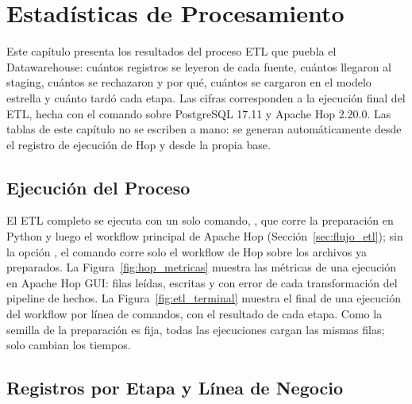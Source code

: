 \section{Estadísticas de Procesamiento}
\label{sec:estadisticas}

Este capítulo presenta los resultados del proceso ETL que puebla el
Datawarehouse: cuántos registros se leyeron de cada fuente, cuántos llegaron
al staging, cuántos se rechazaron y por qué, cuántos se cargaron en el modelo
estrella y cuánto tardó cada etapa. Las cifras corresponden a la ejecución
final del ETL, hecha con el comando  sobre PostgreSQL 17.11 y Apache Hop 2.20.0. Las tablas de este
capítulo no se escriben a mano: se generan automáticamente desde el registro
de ejecución de Hop y desde la propia base.

\subsection{Ejecución del Proceso}

El ETL completo se ejecuta con un solo comando,
, que corre la preparación en Python
y luego el workflow principal de Apache Hop (Sección~\ref{sec:flujo_etl});
sin la opción , el comando corre solo el workflow de Hop sobre
los archivos ya preparados. La Figura~\ref{fig:hop_metricas} muestra las
métricas de una ejecución en Apache Hop GUI: filas leídas, escritas y con
error de cada transformación del pipeline de hechos. La
Figura~\ref{fig:etl_terminal} muestra el final de una ejecución del workflow
por línea de comandos, con el resultado de cada etapa. Como la semilla de la
preparación es fija, todas las ejecuciones cargan las mismas filas; solo
cambian los tiempos.


\subsection{Registros por Etapa y Línea de Negocio}

